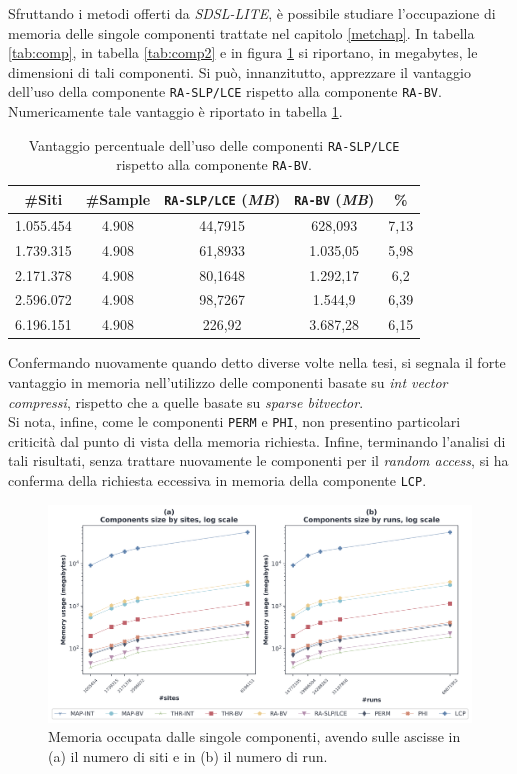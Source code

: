 Sfruttando i metodi offerti da \textit{SDSL-LITE}, è possibile studiare
l'occupazione di memoria delle singole componenti trattate nel capitolo
\ref{metchap}. 
In tabella \ref{tab:comp}, in tabella \ref{tab:comp2} e in figura \ref{fig:comp}
si riportano, in megabytes, 
le dimensioni di tali componenti. Si può,
innanzitutto, apprezzare il vantaggio dell'uso della componente
\texttt{RA-SLP/LCE} rispetto alla 
componente \texttt{RA-BV}. Numericamente tale vantaggio è riportato in tabella
\ref{tab:slppanel}.
\begin{table}
  \centering
  \caption{Vantaggio percentuale dell'uso delle componenti \texttt{RA-SLP/LCE}
    rispetto alla componente \texttt{RA-BV}.}
  \begin{tabular}{c|c|c|c|c}
    \textbf{\#Siti} & \textbf{\#Sample} & \textbf{\texttt{RA-SLP/LCE}
                                          (\textit{MB})}
    & \textbf{\texttt{RA-BV} (\textit{MB})} & \textbf{\%}\\
    \hline
    1.055.454 & 4.908 & 44,7915 & 628,093 & 7,13\\
    1.739.315 & 4.908 & 61,8933 & 1.035,05 & 5,98\\
    2.171.378 & 4.908 & 80,1648 & 1.292,17 & 6,2\\
    2.596.072 & 4.908 & 98,7267 & 1.544,9 & 6,39\\
    6.196.151 & 4.908 & 226,92 & 3.687,28 & 6,15\\
  \end{tabular}
  \label{tab:slppanel}
\end{table}
Confermando nuovamente quando detto diverse volte nella tesi, si segnala il
forte vantaggio in memoria nell'utilizzo delle componenti basate su \textit{int
  vector compressi}, rispetto che a quelle basate su \textit{sparse
  bitvector}.\\
Si nota, infine, come le componenti \texttt{PERM} e \texttt{PHI}, non
presentino particolari criticità dal punto di vista della memoria
richiesta. Infine, terminando l'analisi di tali risultati, senza trattare
nuovamente le componenti per il \textit{random access}, si ha conferma della
richiesta eccessiva in memoria della componente \texttt{LCP}.
\begin{figure}
  \centering
    \includegraphics[width=\linewidth]{img/comp_mem.png}
  \caption{Memoria occupata dalle singole componenti, avendo sulle ascisse in
    (a) il numero di siti e in (b) il numero di run. }
  \label{fig:comp}
\end{figure}
